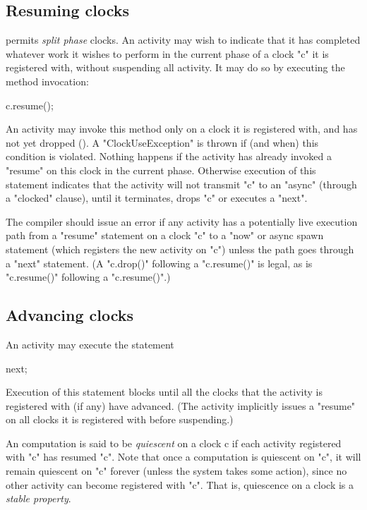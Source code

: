\subsection{Resuming clocks}\label{resume}\label{sec:clock:resume}
\Xten{} permits {\em split phase} clocks. An activity may wish
to indicate that it has completed whatever work it wishes to perform
in the current phase of a  clock \xcd"c" it is registered with, without
suspending all activity. It may do so  by executing the method
invocation:
\begin{xten}
c.resume();
\end{xten}

An activity may invoke this method only on a clock it is registered
with, and has not yet dropped (). A \xcd"ClockUseException" is thrown if (and
when) this condition is violated.  Nothing happens if the activity has
already invoked a \xcd"resume" on this clock in the current phase.
Otherwise execution of this statement indicates that the activity will
not transmit \xcd"c" to an \xcd"async" (through a \xcd"clocked"
clause),
until it terminates, drops \xcd"c" or executes a \xcd"next". 

\begin{staticrule*}
The compiler should issue an error if any activity has a potentially
live execution path from a \xcd"resume" statement on a clock \xcd"c"
to a \xcd"now" or async spawn statement (which registers the new
activity on \xcd"c") unless the path goes through a \xcd"next"
statement. (A \xcd"c.drop()" following a \xcd"c.resume()" is legal,
as is \xcd"c.resume()" following a \xcd"c.resume()".)
\end{staticrule*}

\subsection{Advancing clocks}\label{sec:clock:next}
An activity may execute the statement
\begin{xten}
next;
\end{xten}

\noindent 
Execution of this statement blocks until all the clocks that the
activity is registered with (if any) have advanced. (The activity
implicitly issues a \xcd"resume" on all clocks it is registered
with before suspending.)

An \Xten{} computation is said to be {\em quiescent} on a clock {\cf
c} if each activity registered with \xcd"c" has resumed \xcd"c".
Note that once a computation is quiescent on \xcd"c", it will remain
quiescent on \xcd"c" forever (unless the system takes some action),
since no other activity can become registered with \xcd"c".  That is,
quiescence on a clock is a {\em stable property}.

